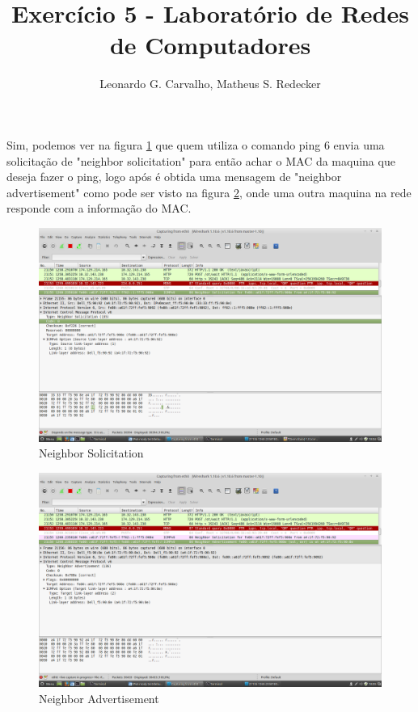 \documentclass[12pt]{article}
\title{Exercício 5 - Laboratório de Redes de Computadores}
\author{Leonardo G. Carvalho\inst{1}, Matheus S. Redecker\inst{1}}
\begin{document}
 

\maketitle


\section{}
 Sim, podemos ver na figura \ref{1solicitation} que quem utiliza o comando ping 6 envia uma solicitação de "neighbor solicitation" para então achar o MAC da maquina que deseja fazer o ping, logo após é obtida uma mensagem de "neighbor advertisement" como pode ser visto na figura \ref{1advertisement}, onde uma outra maquina na rede responde com a informação do MAC.


\begin{figure}[ht]
\centering
\includegraphics[scale=0.25]{neighborsolicitation.png}
\caption{Neighbor Solicitation}
\label{1solicitation}
\end{figure}

\newpage{}

\begin{figure}[ht]
\centering
\includegraphics[scale=0.25]{neighboradvertisement.png}
\caption{Neighbor Advertisement}
\label{1advertisement}
\end{figure}
\end{document}
